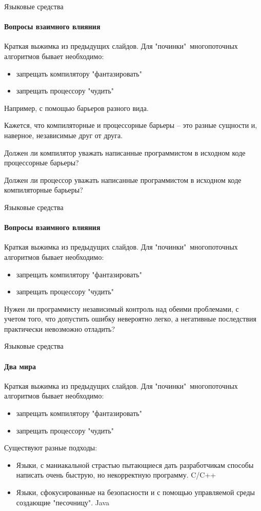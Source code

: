 \begin{frame}[t]{Языковые средства}
\framesubtitle{Вопросы взаимного влияния}

Краткая выжимка из предыдущих слайдов. Для "починки"\ многопоточных алгоритмов бывает необходимо:
\begin{itemize}
  \item запрещать компилятору "фантазировать"
  \item запрещать процессору "чудить"
\end{itemize}

\pause
Например, с помощью барьеров разного вида. 

\pause
Кажется, что компиляторные и процессорные барьеры -- это разные сущности и, наверное, независимые друг от друга. 

\pause
Должен ли компилятор уважать написанные программистом в исходном коде процессорные барьеры?

\pause
Должен ли процессор уважать написанные программистом в исходном коде компиляторные барьеры?
\end{frame}

\begin{frame}[t, noframenumbering]{Языковые средства}
\framesubtitle{Вопросы взаимного влияния}

Краткая выжимка из предыдущих слайдов. Для "починки"\ многопоточных алгоритмов бывает необходимо:
\begin{itemize}
  \item запрещать компилятору "фантазировать"
  \item запрещать процессору "чудить"
\end{itemize}

Нужен ли программисту независимый контроль над обеими проблемами, с учетом того, что допустить ошибку невероятно легко, а негативные последствия практически невозможно отладить?

\end{frame}


\begin{frame}[t]{Языковые средства}
\framesubtitle{Два мира}

Краткая выжимка из предыдущих слайдов. Для "починки"\ многопоточных алгоритмов бывает необходимо:
\begin{itemize}
  \item запрещать компилятору "фантазировать"
  \item запрещать процессору "чудить"
\end{itemize}

Существуют разные подходы:
\begin{itemize}
  
  \pause
  \item Языки, с маниакальной страстью пытающиеся дать разработчикам способы написать очень быструю, но некорректную программу.
  \pause
  C/C++

  \pause
  \item Языки, сфокусированные на безопасности и с помощью управляемой среды создающие "песочницу".
  \pause
  Java
\end{itemize}
\end{frame}


